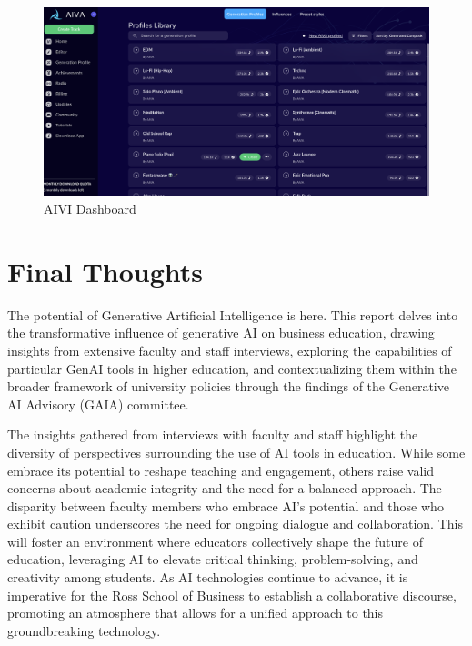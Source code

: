 \documentclass[
]{book}
\begin{document}
\begin{figure}

{\centering \includegraphics[width=0.95\linewidth]{AIVI_Dashboard} 

}

\caption{AIVI Dashboard}\label{fig:unnamed-chunk-17}
\end{figure}

\hypertarget{final-thoughts}{%
\chapter{Final Thoughts}\label{final-thoughts}}

The potential of Generative Artificial Intelligence is here. This report delves into the transformative influence of generative AI on business education, drawing insights from extensive faculty and staff interviews, exploring the capabilities of particular GenAI tools in higher education, and contextualizing them within the broader framework of university policies through the findings of the Generative AI Advisory (GAIA) committee.

The insights gathered from interviews with faculty and staff highlight the diversity of perspectives surrounding the use of AI tools in education. While some embrace its potential to reshape teaching and engagement, others raise valid concerns about academic integrity and the need for a balanced approach. The disparity between faculty members who embrace AI's potential and those who exhibit caution underscores the need for ongoing dialogue and collaboration. This will foster an environment where educators collectively shape the future of education, leveraging AI to elevate critical thinking, problem-solving, and creativity among students. As AI technologies continue to advance, it is imperative for the Ross School of Business to establish a collaborative discourse, promoting an atmosphere that allows for a unified approach to this groundbreaking technology.
\end{document}
